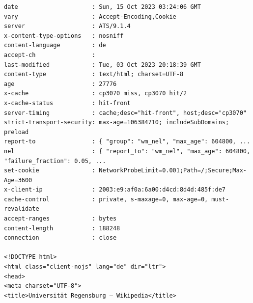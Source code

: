 
\begin{frame}[fragile]
%
\vspace{-6pt}
\begin{cmdbox}[Output]
\begin{verbatim}
date                     : Sun, 15 Oct 2023 03:24:06 GMT
vary                     : Accept-Encoding,Cookie
server                   : ATS/9.1.4
x-content-type-options   : nosniff
content-language         : de
accept-ch                : 
last-modified            : Tue, 03 Oct 2023 20:18:39 GMT
content-type             : text/html; charset=UTF-8
age                      : 27776
x-cache                  : cp3070 miss, cp3070 hit/2
x-cache-status           : hit-front
server-timing            : cache;desc="hit-front", host;desc="cp3070"
strict-transport-security: max-age=106384710; includeSubDomains; preload
report-to                : { "group": "wm_nel", "max_age": 604800, ...
nel                      : { "report_to": "wm_nel", "max_age": 604800, "failure_fraction": 0.05, ...
set-cookie               : NetworkProbeLimit=0.001;Path=/;Secure;Max-Age=3600
x-client-ip              : 2003:e9:af0a:6a00:d4cd:8d4d:485f:de7
cache-control            : private, s-maxage=0, max-age=0, must-revalidate
accept-ranges            : bytes
content-length           : 188248
connection               : close

<!DOCTYPE html>
<html class="client-nojs" lang="de" dir="ltr">
<head>
<meta charset="UTF-8">
<title>Universität Regensburg – Wikipedia</title>
\end{verbatim}
\end{cmdbox}
%
\end{frame}


